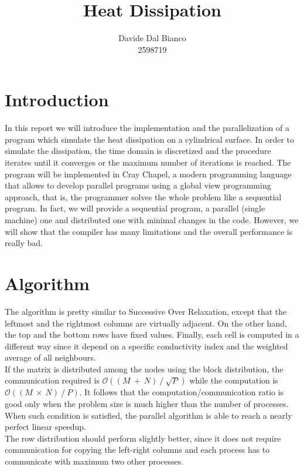 \documentclass{article}
\title{Heat Dissipation}
\author{Davide Dal Bianco \\ 2598719}
\begin{document}
\maketitle

\section{Introduction} \label{sec:introduction}
In this report we will introduce the implementation and the parallelization of a program which simulate the heat dissipation on a cylindrical surface. In order to simulate the dissipation, the time domain is discretized and the procedure iterates until it converges or the maximum number of iterations is reached. The program will be implemented in Cray Chapel, a modern programming language that allows to develop parallel programs using a global view programming approach, that is, the programmer solves the whole problem like a sequential program. In fact, we will provide a sequential program, a parallel (single machine) one and distributed one with minimal changes in the code. However, we will show that the compiler has many limitations and the overall performance is really bad.

\section{Algorithm} \label{sec:algorithm}
The algorithm is pretty similar to Successive Over Relaxation, except that the leftmost and the rightmost columns are virtually adjacent. On the other hand, the top and the bottom rows have fixed values. Finally, each cell is computed in a different way since it depend on a specific conductivity index and the weighted average of all neighbours. \\
If the matrix is distributed among the nodes using the block distribution, the communication required is $\mathcal{O}((M~+~N)~/~\sqrt{P})$ while the computation is $\mathcal{O}((M~\times~N)~/~P)$. It follows that the computation/communication ratio is good only when the problem size is much higher than the number of processes. When such condition is satisfied, the parallel algorithm is able to reach a nearly perfect linear speedup. \\
The row distribution should perform slightly better, since it does not require communication for copying the left-right columns and each process has to communicate with maximum two other processes.
\end{document}
